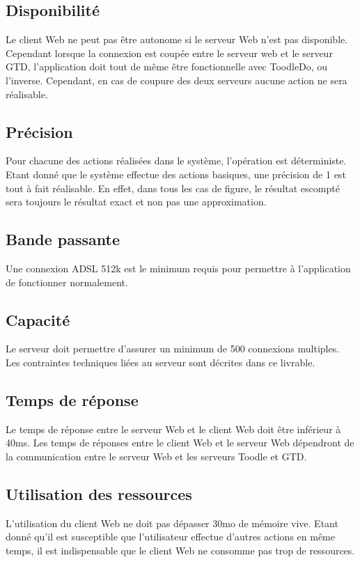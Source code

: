 		
		\subsection{Disponibilité}	
		Le client Web ne peut pas être autonome si le serveur Web n'est pas disponible. Cependant lorsque la connexion est coupée entre le serveur web et le serveur GTD, l'application doit tout de même être fonctionnelle avec ToodleDo, ou l'inverse. Cependant, en cas de coupure des deux serveurs aucune action ne sera réalisable.		
	
	
		\subsection{Précision}		
		Pour chacune des actions réalisées dans le système, l'opération est déterministe. Etant donné que le système effectue des actions basiques, une précision de 1 est tout à fait réalisable. En effet, dans tous les cas de figure, le résultat escompté sera toujours le résultat exact et non pas une approximation.
	
	
		\subsection{Bande passante}	
		Une connexion ADSL 512k est le minimum requis pour permettre à l'application de fonctionner normalement.
		
		\subsection{Capacité}
		Le serveur doit permettre d'assurer un minimum de 500 connexions multiples. Les contraintes techniques liées au serveur sont décrites dans ce livrable.
	
		\subsection{Temps de réponse}	
		Le temps de réponse entre le serveur Web et le client Web doit être inférieur à 40ms. Les temps de réponses entre le client Web et le serveur Web dépendront de la communication entre le serveur Web et les serveurs Toodle et GTD. 

		\subsection{Utilisation des ressources}
		L'utilisation du client Web ne doit pas dépasser 30mo de mémoire vive. Etant donné qu'il est susceptible que l'utilisateur effectue d'autres actions en même temps, il est indispensable que le client Web ne consomme pas trop de ressources.
	

